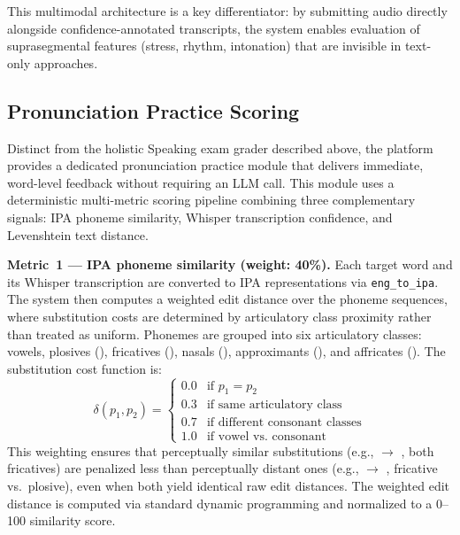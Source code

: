 \documentclass{IEEEtran}
\begin{document}
This multimodal architecture is a key differentiator: by submitting audio directly alongside confidence-annotated transcripts, the system enables evaluation of suprasegmental features (stress, rhythm, intonation) that are invisible in text-only approaches.

\subsection{Pronunciation Practice Scoring}

Distinct from the holistic Speaking exam grader described above, the platform provides a dedicated pronunciation practice module that delivers immediate, word-level feedback without requiring an LLM call. This module uses a deterministic multi-metric scoring pipeline combining three complementary signals: IPA phoneme similarity, Whisper transcription confidence, and Levenshtein text distance.

\textbf{Metric~1 --- IPA phoneme similarity (weight: 40\%).} Each target word and its Whisper transcription are converted to IPA representations via \texttt{eng\_to\_ipa}. The system then computes a weighted edit distance over the phoneme sequences, where substitution costs are determined by articulatory class proximity rather than treated as uniform. Phonemes are grouped into six articulatory classes: vowels, plosives (), fricatives (), nasals (), approximants (), and affricates (). The substitution cost function is:
\begin{equation}
\delta(p_1, p_2) = \begin{cases}
0.0 & \text{if } p_1 = p_2 \\
0.3 & \text{if same articulatory class} \\
0.7 & \text{if different consonant classes} \\
1.0 & \text{if vowel vs.\ consonant}
\end{cases}
\label{eq:phoneme_cost}
\end{equation}
This weighting ensures that perceptually similar substitutions (e.g.,  $\rightarrow$ , both fricatives) are penalized less than perceptually distant ones (e.g.,  $\rightarrow$ , fricative vs.\ plosive), even when both yield identical raw edit distances. The weighted edit distance is computed via standard dynamic programming and normalized to a 0--100 similarity score.
\end{document}
